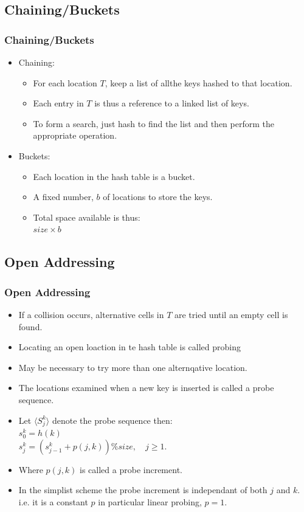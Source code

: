 \documentclass{beamer}
\begin{document}
\subsection{Chaining/Buckets}
\begin{frame}
\frametitle{Chaining/Buckets}
\begin{itemize}
\item Chaining:
\begin{itemize}
\item For each location $T$, keep a {\color{red} list} of allthe keys hashed to that location.
\item Each entry in $T$ is thus a reference to a linked list of keys.
\item To form a search, just hash to find the list and then perform the appropriate operation.
\end{itemize}
\item Buckets:
\begin{itemize}
\item Each location in the hash table is a bucket.
\item A fixed number, $b$ of locations to store the keys.
\item Total space available is thus:\\
$size \times b$
\end{itemize}
\end{itemize}
\end{frame}
\subsection{Open Addressing}
\begin{frame}
\frametitle{Open Addressing}
\begin{itemize}
\item If a collision occurs, alternative cells in $T$ are tried until an empty cell is found.
\item Locating an open loaction in te hash table is called {\color{green}probing} 
\item May be necessary to try more than one alternqative location.
\item The locations examined when a new key is inserted is called a {\color{purple}probe sequence}.
\item Let $\langle S_j^k\rangle$ denote the probe sequence then:\\
$s_0^k = h(k)$\\
$s_j^k = (s^k_{j-1} + p(j,k))\%size, \quad j \geq 1$.\\
\item Where $p(j,k)$ is called a {\color{red}probe increment}.
\item In the simplist scheme the probe increment is independant of both $j$ and $k$. i.e. it is a constant $p$ in particular {\color{magenta}linear probing}, $p=1$.
\end{itemize}
\end{frame}
\end{document}
